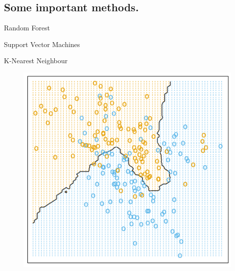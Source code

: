 \documentclass{beamer}
\begin{document}
\subsection{Some important methods.}
\frame{
\tableofcontents[ 
    currentsubsection, 
    sectionstyle=show/hide, 
    sectionstyle=show/shaded, 
    ] 
}

\begin{frame}{Random Forest}
\begin{center}
\end{center}
\end{frame}



\begin{frame}{Support Vector Machines}
\begin{center}
\end{center}
\end{frame}

\begin{frame}{K-Nearest Neighbour}
 \begin{figure}[ht!]
 \centering
 \includegraphics[scale=0.5]{knn.png}
\end{figure}

\end{frame}
\end{document}
